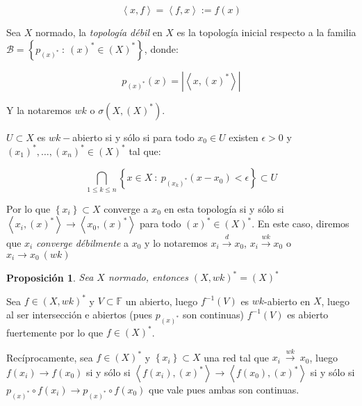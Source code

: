 \documentclass[11pt]{article}
\newcommand{\B}{\mathcal{B}}
\newcommand\tq{~:~}
\newcommand{\dual}[1]{\left(#1\right)^{\ast}}
\newcommand{\abs}[1]{\left\lvert#1\right\rvert}
\newcommand{\ip}[1]{\left\langle#1\right\rangle}
\newcommand{\sett}[1]{\left\lbrace#1\right\rbrace}
\newcommand{\Bigcap}[2]{\bigcap\limits_{#1}{#2}}
\numberwithin{theorem}{subsection}
\newtheorem{proposition}[theorem]{Proposici\'on}
\newenvironment{proof}[1][Demostraci\'on]{\begin{trivlist}
		\item[\hskip \labelsep {\bfseries #1}]}{\end{trivlist}}
\newenvironment{definition}[1][Definici\'on]{\begin{trivlist}
		\item[\hskip \labelsep {\bfseries #1}]}{\end{trivlist}}
\newenvironment{remark}[1][Observaci\'on]{\begin{trivlist}
		\item[\hskip \labelsep {\bfseries #1}]}{\end{trivlist}}
\newcommand{\qed}{\nobreak \ifvmode \relax \else
	\ifdim\lastskip<1.5em \hskip-\lastskip
	\hskip1.5em plus0em minus0.5em \fi \nobreak
	\vrule height0.75em width0.5em depth0.25em\fi}
\begin{document}
$$\ip{x,f} = \ip{f,x} := f(x)$$


\begin{definition}
	Sea $X$ normado, la \textit{topolog\'ia d\'ebil} en $X$ es la topolog\'ia inicial respecto a la familia $\B = \sett{p_{\dual{x}} \tq \dual{x} \in \dual{X}}$, donde:
	
	\begin{equation*}
		p_{\dual{x}}(x) = \abs{\ip{x,\dual{x}}}
	\end{equation*}
	
	Y la notaremos $wk$ o $\sigma(X,\dual{X})$. 
	
\end{definition}

\begin{remark}
	$U \subset X$ es $wk-$abierto si y s\'olo si para todo $x_0 \in U$ existen $\epsilon > 0$ y $\dual{x_1}, \dots, \dual{x_n} \in \dual{X}$ tal que:
	
	\begin{equation*}
		\Bigcap{1 \leq k \leq n}{\sett{x \in X \tq p_{\dual{x_k}}(x-x_0) < \epsilon}} \subset U
	\end{equation*}
	
	Por lo que $\sett{x_i} \subset X$ converge a $x_0$ en esta topolog\'ia si y s\'olo si $\ip{x_i,\dual{x}} \rightarrow \ip{x_0,\dual{x}}$ para todo $\dual{x} \in \dual{X}$. En este caso, diremos que $x_i$ \textit{converge d\'ebilmente} a $x_0$ y lo notaremos $x_i \xrightarrow{d} x_0$, $x_i \xrightarrow{wk} x_0$ o $x_i \rightarrow x_0 \ (wk)$
\end{remark}	



\begin{proposition}
	\label{El dual a la topologia debil es la dual fuerte}
	Sea $X$ normado, entonces $\dual{X,wk} = \dual{X}$
\end{proposition}

\begin{proof}
	Sea $f \in \dual{X,wk}$ y $V \subset \mathbb{F}$ un abierto, luego $f^{-1}(V)$ es $wk$-abierto en $X$, luego al ser intersecci\'on e abiertos (pues $p_{\dual{x}}$ son continuas) $f^{-1}(V)$ es abierto fuertemente por lo que $f \in \dual{X}$.
	
	Rec\'iprocamente, sea $f \in \dual{X}$ y $\sett{x_i} \subset X$ una red tal que $x_i \ \xrightarrow{wk} \ x_0$, luego $f(x_i) \rightarrow f(x_0)$ si y s\'olo si $\ip{f(x_i),\dual{x}} \rightarrow \ip{f(x_0), \dual{x}}$ si y s\'olo si $p_{\dual{x}} \circ f(x_i) \rightarrow p_{\dual{x}} \circ f (x_0)$ que vale pues ambas son continuas. \qed
	
\end{proof}
\end{document}
